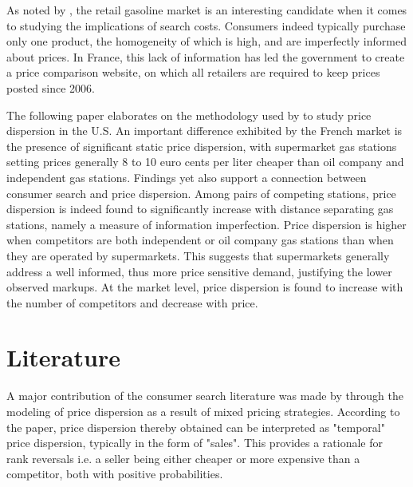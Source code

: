 \documentclass[english]{article}
\begin{document}
As noted by \cite{TAP11}, the retail gasoline market is an interesting candidate when it comes to studying the implications of search costs. Consumers indeed typically purchase only one product, the homogeneity of which is high, and are imperfectly informed about prices. In France, this lack of information has led the government to create a price comparison website, on which all retailers are required to keep prices posted since 2006.

The following paper elaborates on the methodology used by \cite{TAP11} to study price dispersion in the U.S. An important difference exhibited by the French market is the presence of significant static price dispersion, with supermarket gas stations setting prices generally 8 to 10 euro cents per liter cheaper than oil company and independent gas stations. Findings yet also support a connection between consumer search and price dispersion. Among pairs of competing stations, price dispersion is indeed found to significantly increase with distance separating gas stations, namely a measure of information imperfection. Price dispersion is higher when competitors are both independent or oil company gas stations than when they are operated by supermarkets. This suggests that supermarkets generally address a well informed, thus more price sensitive demand, justifying the lower observed markups. At the market level, price dispersion is found to increase with the number of competitors and decrease with price.

\section{Literature}

A major contribution of the consumer search literature was made by \cite{VAR80} through the modeling of price dispersion as a result of mixed pricing strategies. According to the paper, price dispersion thereby obtained can be interpreted as "temporal" price dispersion, typically in the form of "sales". This provides a rationale for rank reversals i.e. a seller being either cheaper or more expensive than a competitor, both with positive probabilities.
\end{document}
